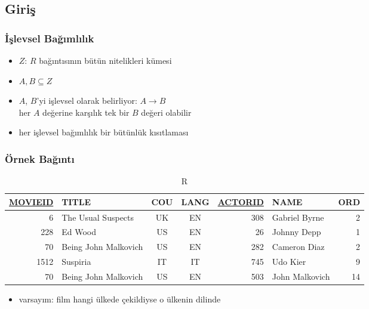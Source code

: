 \documentclass[dvipsnames]{beamer}
\theoremstyle{theorem}
\begin{document}
\subsection{Giriş}

\begin{frame}
  \frametitle{İşlevsel Bağımlılık}

    \begin{itemize}
      \item $Z$: $R$ bağıntısının bütün nitelikleri kümesi
      \item $A,B \subseteq Z$
      \item \alert{$A$, $B$'yi işlevsel olarak belirliyor}: $A \rightarrow B$\\
        her $A$ değerine karşılık tek bir $B$ değeri olabilir

      \medskip
      \item her işlevsel bağımlılık bir bütünlük kısıtlaması
  \end{itemize}
\end{frame}

\begin{frame}
\label{example_db_1}
  \frametitle{Örnek Bağıntı}
  
  \begin{tiny}
  \begin{table}
    \caption{R}
    \begin{tabular}{|r|l|c|c|r|l|r|}\hline
\underline{MOVIEID} & TITLE    & COU & LANG & \underline{ACTORID} & NAME & ORD\\[2pt]\hline\hline
      6 & The Usual Suspects   & UK  &  EN  &     308 & Gabriel Byrne    &   2\\\hline
    228 & Ed Wood              & US  &  EN  &      26 & Johnny Depp      &   1\\\hline
     70 & Being John Malkovich & US  &  EN  &     282 & Cameron Diaz     &   2\\\hline
   1512 & Suspiria             & IT  &  IT  &     745 & Udo Kier         &   9\\\hline
     70 & Being John Malkovich & US  &  EN  &     503 & John Malkovich   &  14\\\hline
    \end{tabular}
  \end{table}
  \end{tiny}

  \pause
  \begin{itemize}
    \item varsayım: film hangi ülkede çekildiyse o ülkenin dilinde
  \end{itemize}
\end{frame}
\end{document}
